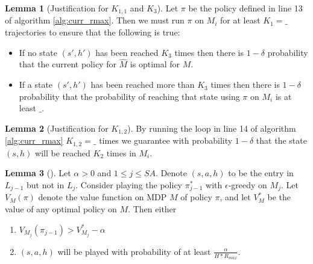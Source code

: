 \documentclass[12pt, letterpaper]{article}
\theoremstyle{definition}
\newtheorem*{lemma}{Lemma}
\theoremstyle{remark}
\begin{document}
\begin{lemma}[Justification for \(K_{1, 1}\) and \(K_3\)]
    Let \(\pi\) be the policy defined in line 13 of algorithm \ref{alg:curr_rmax}. Then we must run \(\pi\) on \(M_i\) for at least \(K_1 = \_\) trajectories to ensure that the following is true:
    \begin{itemize}
        \item If no state \((s', h')\) has been reached \(K_3\) times then there is \(1 - \delta\) probability that the current policy for \(\hat{M}\) is optimal for \(M\).
        \item If a state \((s', h')\) has been reached more than \(K_3\) times then there is \(1 - \delta\) probability that the probability of reaching that state using \(\pi\) on \(M_i\) is at least \(\_\).
    \end{itemize}
    
\end{lemma}

\begin{lemma}[Justification for \(K_{1, 2}\)]
    By running the loop in line 14 of algorithm \ref{alg:curr_rmax} \(K_{1, 2} = \_\) times we guarantee with probability \(1 - \delta\) that the state \((s, h)\) will be reached \(K_2\) times in \(M_i\).
\end{lemma}


\begin{lemma}[]
    Let \(\alpha > 0\) and \(1 \leq j \leq SA\). Denote \((s, a, h)\) to be the entry in \(L_{j-1}\) but not in \(L_{j}\). Consider playing the policy \(\pi_{j-1}^*\) with \(\epsilon\)-greedy on \(M_j\). Let \(V_{M}(\pi)\) denote the value function on MDP \(M\) of policy \(\pi\), and let \(V^*_{M}\) be the value of any optimal policy on \(M\). Then either

    \begin{enumerate}
        \item \(V_{M_j} (\pi_{j-1}) > V^*_{M_j} - \alpha\)
        \item \((s, a, h)\) will be played with probability of at least \(\frac{\alpha}{H*R_{max}}\).
    \end{enumerate}
    
\end{lemma}
\end{document}

